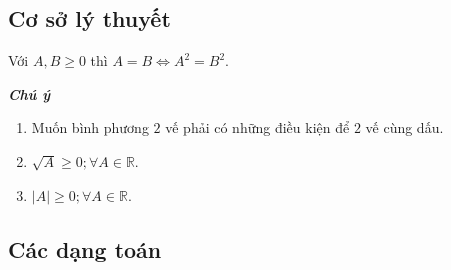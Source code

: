 \subsection{Cơ sở lý thuyết}
\begin{dl}
	Với $A,B\geq 0$ thì $A=B\Leftrightarrow A^2=B^2$.
\end{dl}
\begin{note}
	\textbf{\textit{	Chú ý}}
	\begin{enumerate}
		\item Muốn bình phương $2$ vế phải có những điều kiện để $2$ vế cùng dấu.
		\item $\sqrt{A}\geq 0 ;\forall A\in\mathbb{R}$.
		\item $\vert A\vert \geq 0 ;\forall A\in\mathbb{R}$.
	\end{enumerate}
\end{note}

\subsection{Các dạng toán}

